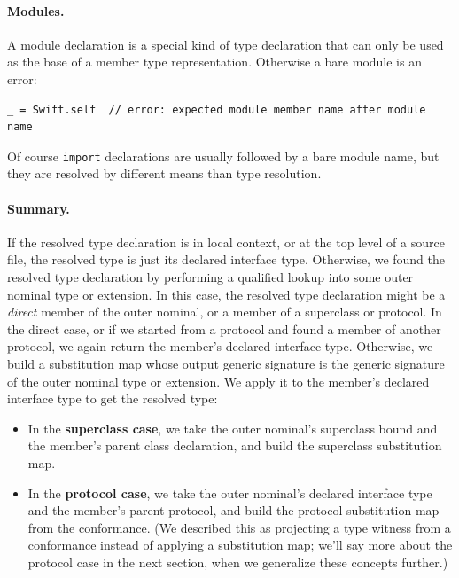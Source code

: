 \documentclass[../generics]{subfiles}
\begin{document}
\paragraph{Modules.}
A module declaration is a special kind of type declaration that can only be used as the base of a member type representation. Otherwise a bare module is an error:
\begin{Verbatim}
_ = Swift.self  // error: expected module member name after module name
\end{Verbatim}
Of course \texttt{import} declarations are usually followed by a bare module name, but they are resolved by different means than type resolution.

\paragraph{Summary.} If the resolved type declaration is in local context, or at the top level of a source file, the resolved type is just its declared interface type. Otherwise, we found the resolved type declaration by performing a qualified lookup into some outer nominal type or extension. In this case, the resolved type declaration might be a \emph{direct} member of the outer nominal, or a member of a superclass or protocol. In the direct case, or if we started from a protocol and found a member of another protocol, we again return the member's declared interface type. Otherwise, we build a substitution map whose output generic signature is the generic signature of the outer nominal type or extension. We apply it to the member's declared interface type to get the resolved type:
\begin{itemize}
\item
In the \textbf{superclass case}, we take the outer nominal's superclass bound and the member's parent class declaration, and build the superclass substitution map.
\item
In the \textbf{protocol case}, we take the outer nominal's declared interface type and the member's parent protocol, and build the protocol substitution map from the conformance. (We described this as projecting a type witness from a conformance instead of applying a substitution map; we'll say more about the protocol case in the next section, when we generalize these concepts further.)
\end{itemize}
\end{document}
